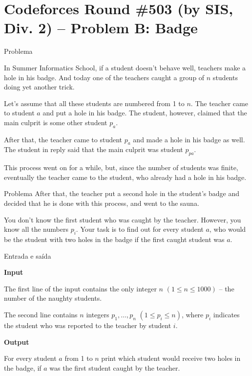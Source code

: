 \section{Codeforces Round \#503 (by SIS, Div. 2) -- Problem B: Badge}

\begin{frame}[fragile]{Problema}

In Summer Informatics School, if a student doesn't behave well, teachers make a hole in his badge. 
And today one of the teachers caught a group of $n$ students doing yet another trick.

Let's assume that all these students are numbered from 1 to $n$. The teacher came to student $a$ 
and put a hole in his badge. The student, however, claimed that the main culprit is some other 
student $p_a$.

After that, the teacher came to student $p_a$ and made a hole in his badge as well. The student in 
reply said that the main culprit was student $p_{pa}$.

This process went on for a while, but, since the number of students was finite, eventually the teacher came to the student, who already had a hole in his badge.
\end{frame}

\begin{frame}[fragile]{Problema}
After that, the teacher put a second hole in the student's badge and decided that he is done with this process, and went to the sauna.

You don't know the first student who was caught by the teacher. However, you know all the numbers $p_i$. Your task is to find out for every student $a$, who would be the student with two holes in the badge if the first caught student was $a$.
\end{frame}

\begin{frame}[fragile]{Entrada e saída}

\textbf{Input}

The first line of the input contains the only integer $n$ $(1\leq n\leq 1000)$ -- the number of the naughty students.

The second line contains $n$ integers $p_1, \ldots, p_n$ $(1\leq p_i\leq n)$, where $p_i$ indicates 
the student who was reported to the teacher by student $i$.

\textbf{Output}

For every student $a$ from 1 to $n$ print which student would receive two holes in the badge, if $a$ was the first student caught by the teacher.

\end{frame}

